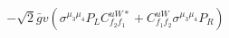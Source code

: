 %
\begin{dmath*}
%
  -  \sqrt{2} {\bar g}{} v \left(\sigma^{\mu_3 \mu_4} P_L  C^{uW*}_{f_2 f_1} + C^{uW}_{f_1 f_2} \sigma^{\mu_3 \mu_4} P_R \right)
%
\end{dmath*}
%
